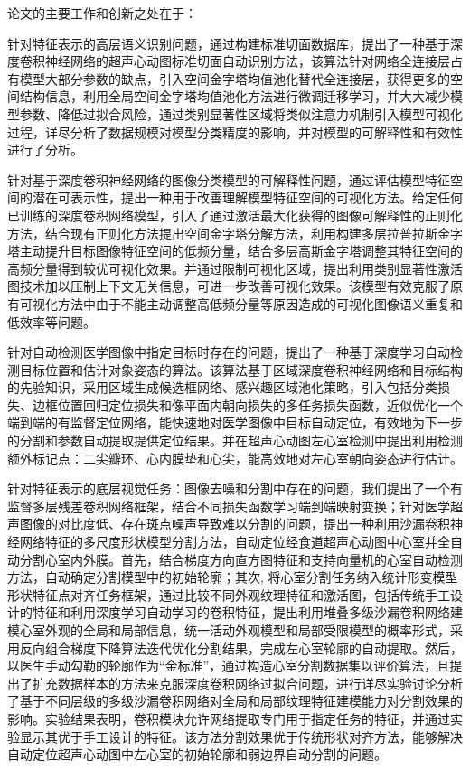论文的主要工作和创新之处在于：

针对特征表示的高层语义识别问题，通过构建标准切面数据库，提出了一种基于深度卷积神经网络的超声心动图标准切面自动识别方法，该算法针对网络全连接层占有模型大部分参数的缺点，引入空间金字塔均值池化替代全连接层，获得更多的空间结构信息，利用全局空间金字塔均值池化方法进行微调迁移学习，并大大减少模型参数、降低过拟合风险，通过类别显著性区域将类似注意力机制引入模型可视化过程，详尽分析了数据规模对模型分类精度的影响，并对模型的可解释性和有效性进行了分析。

针对基于深度卷积神经网络的图像分类模型的可解释性问题，通过评估模型特征空间的潜在可表示性，提出一种用于改善理解模型特征空间的可视化方法。给定任何已训练的深度卷积网络模型，引入了通过激活最大化获得的图像可解释性的正则化方法，结合现有正则化方法提出空间金字塔分解方法，利用构建多层拉普拉斯金字塔主动提升目标图像特征空间的低频分量，结合多层高斯金字塔调整其特征空间的高频分量得到较优可视化效果。并通过限制可视化区域，提出利用类别显著性激活图技术加以压制上下文无关信息，可进一步改善可视化效果。该模型有效克服了原有可视化方法中由于不能主动调整高低频分量等原因造成的可视化图像语义重复和低效率等问题。

针对自动检测医学图像中指定目标时存在的问题，提出了一种基于深度学习自动检测目标位置和估计对象姿态的算法。该算法基于区域深度卷积神经网络和目标结构的先验知识，采用区域生成候选框网络、感兴趣区域池化策略，引入包括分类损失、边框位置回归定位损失和像平面内朝向损失的多任务损失函数，近似优化一个端到端的有监督定位网络，能快速地对医学图像中目标自动定位，有效地为下一步的分割和参数自动提取提供定位结果。并在超声心动图左心室检测中提出利用检测额外标记点：二尖瓣环、心内膜垫和心尖，能高效地对左心室朝向姿态进行估计。

针对特征表示的底层视觉任务：图像去噪和分割中存在的问题，我们提出了一个有监督多层残差卷积网络框架，结合不同损失函数学习端到端映射变换；针对医学超声图像的对比度低、存在斑点噪声导致难以分割的问题，提出一种利用沙漏卷积神经网络特征的多尺度形状模型分割方法，自动定位经食道超声心动图中心室并全自动分割心室内外膜。首先，结合梯度方向直方图特征和支持向量机的心室自动检测方法，自动确定分割模型中的初始轮廓；其次, 将心室分割任务纳入统计形变模型形状特征点对齐任务框架，通过比较不同外观纹理特征和激活图，包括传统手工设计的特征和利用深度学习自动学习的卷积特征，提出利用堆叠多级沙漏卷积网络建模心室外观的全局和局部信息，统一活动外观模型和局部受限模型的概率形式，采用反向组合梯度下降算法迭代优化分割结果，完成左心室轮廓的自动提取。然后，以医生手动勾勒的轮廓作为“金标准”，通过构造心室分割数据集以评价算法，且提出了扩充数据样本的方法来克服深度卷积网络过拟合问题，进行详尽实验讨论分析了基于不同层级的多级沙漏卷积网络对全局和局部纹理特征建模能力对分割效果的影响。实验结果表明，卷积模块允许网络提取专门用于指定任务的特征，并通过实验显示其优于手工设计的特征。该方法分割效果优于传统形状对齐方法，能够解决自动定位超声心动图中左心室的初始轮廓和弱边界自动分割的问题。


